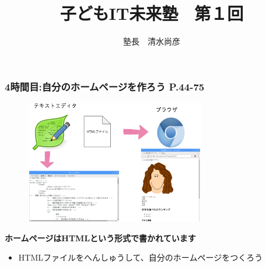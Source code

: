 \documentclass[dvipdfmx]{beamer}
\title{子どもIT未来塾　第１回}
\author{塾長　清水尚彦}
\begin{document}



\begin{frame}[fragile]
	\frametitle{4時間目:自分のホームページを作ろう P.44-75~~~}
    \begin{figure}
      \centering
      \includegraphics[width=0.7\textwidth]{slide04_001.png}\\
    \end{figure}
    \large\textbf{ホームページはHTMLという形式で書かれています}
        \begin{itemize}
          \item HTMLファイルをへんしゅうして、自分のホームページをつくろう
        \end{itemize}
\end{frame}
\end{document}
